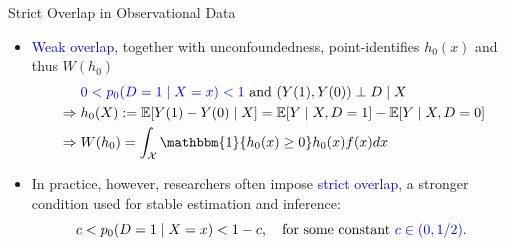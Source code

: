 \documentclass[aspectratio=169,xcolor=dvipsnames]{beamer}
\begin{document}
\begin{frame}{Strict Overlap in Observational Data}
    \begin{itemize}
        \item \textcolor{blue}{Weak overlap}, together with unconfoundedness, point-identifies $h_0(x)$ and thus $W(h_0)$
            \begin{align*}
                & \quad\;\; \textcolor{blue}{0 < p_0(D = 1\mid X=x) < 1} 
                \text{ and } (Y(1), Y(0)) \perp D \mid X\\ 
                & \Rightarrow h_0(X) := \mathbb{E}[Y(1) - Y(0) \mid X] 
                = \mathbb{E}[Y \mid X, D=1] - \mathbb{E}[Y \mid X, D=0]\\
                & \Rightarrow W(h_0) 
                = \int_\mathcal{X}\mathbbm{1}\{h_0(x) \geq 0\} h_0(x)f(x)dx
            \end{align*}

        \item In practice, however, researchers often impose \textcolor{blue}{strict overlap}, a stronger condition used for stable estimation and inference:
            \[
                c < p_0(D = 1\mid X=x) < 1-c, 
                \quad \text{for some constant } \textcolor{blue}{c \in (0, 1/2)}.
            \]
    \end{itemize}
\end{frame}
\end{document}
